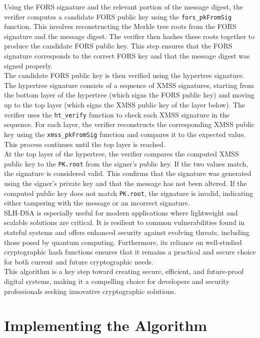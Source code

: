 \documentclass[journal=tosc,notanonymous]{iacrtrans}
\begin{document}
Using the FORS signature and the relevant portion of the message digest, the verifier computes a candidate FORS public key using the \verb|fors_pkFromSig| function. This involves reconstructing the Merkle tree roots from the FORS signature and the message digest. The verifier then hashes these roots together to produce the candidate FORS public key. This step ensures that the FORS signature corresponds to the correct FORS key and that the message digest was signed properly.\\
The candidate FORS public key is then verified using the hypertree signature. The hypertree signature consists of a sequence of XMSS signatures, starting from the bottom layer of the hypertree (which signs the FORS public key) and moving up to the top layer (which signs the XMSS public key of the layer below). The verifier uses the \verb|ht_verify| function to check each XMSS signature in the sequence. For each layer, the verifier reconstructs the corresponding XMSS public key using the \verb|xmss_pkFromSig| function and compares it to the expected value. This process continues until the top layer is reached.\\
At the top layer of the hypertree, the verifier compares the computed XMSS public key to the \texttt{PK.root} from the signer's public key. If the two values match, the signature is considered valid. This confirms that the signature was generated using the signer's private key and that the message has not been altered. If the computed public key does not match \texttt{PK.root}, the signature is invalid, indicating either tampering with the message or an incorrect signature. \cite{national-institute-of-standards-and-technology-2024}\\
\newline
SLH-DSA is especially useful for modern applications where lightweight and scalable solutions are critical. It is resilient to common vulnerabilities found in stateful systems and offers enhanced security against evolving threats, including those posed by quantum computing. Furthermore, its reliance on well-studied cryptographic hash functions ensures that it remains a practical and secure choice for both current and future cryptographic needs.
\\
This algorithm is a key step toward creating secure, efficient, and future-proof digital systems, making it a compelling choice for developers and security professionals seeking innovative cryptographic solutions.


\section{Implementing the Algorithm}
\end{document}

